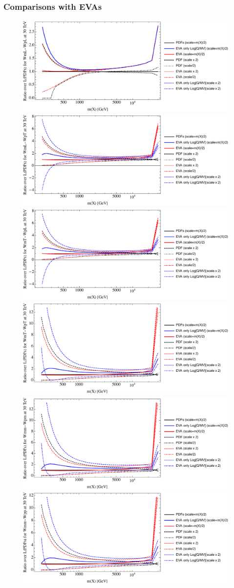 \documentclass[a4paper,11pt]{article}
\begin{document}
\clearpage
\subsubsection{Comparisons with EVAs}


\begin{figure}[ht]
\includegraphics[width=0.4\linewidth]{PlotLumi/30TeV/ratios/WmL-WpL.pdf}
\includegraphics[width=0.4\linewidth]{PlotLumi/30TeV/ratios/WmL-WpT.pdf}
\includegraphics[width=0.4\linewidth]{PlotLumi/30TeV/ratios/WmT-WpL.pdf}
\includegraphics[width=0.4\linewidth]{PlotLumi/30TeV/ratios/WmT-WpT.pdf}
\includegraphics[width=0.4\linewidth]{PlotLumi/30TeV/ratios/Wmm-Wpm.pdf}
\includegraphics[width=0.4\linewidth]{PlotLumi/30TeV/ratios/Wmm-Wpp.pdf}
\end{figure}
\end{document}
